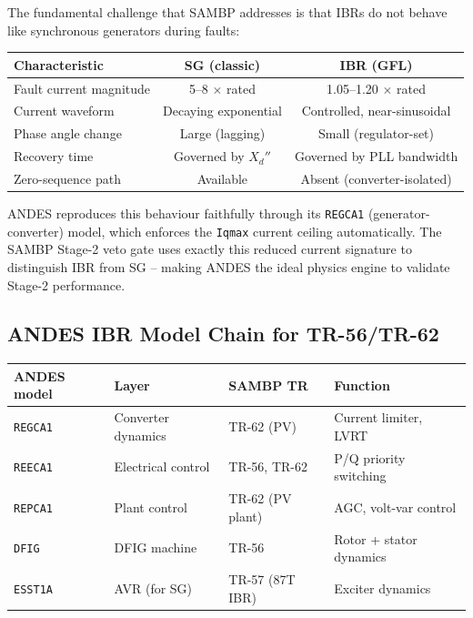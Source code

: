 \documentclass[11pt,a4paper]{article}
\begin{document}
The fundamental challenge that SAMBP addresses is that IBRs do not
behave like synchronous generators during faults:

\begin{center}
\begin{tabular}{lcc}
\toprule
\textbf{Characteristic} & \textbf{SG (classic)} & \textbf{IBR (GFL)} \\
\midrule
Fault current magnitude & 5--8 $\times$ rated & 1.05--1.20 $\times$ rated \\
Current waveform        & Decaying exponential  & Controlled, near-sinusoidal \\
Phase angle change      & Large (lagging)       & Small (regulator-set) \\
Recovery time           & Governed by $X_d''$   & Governed by PLL bandwidth \\
Zero-sequence path      & Available             & Absent (converter-isolated) \\
\bottomrule
\end{tabular}
\end{center}

ANDES reproduces this behaviour faithfully through its \texttt{REGCA1}
(generator-converter) model, which enforces the \texttt{Iqmax} current
ceiling automatically. The SAMBP Stage-2 veto gate uses exactly this
reduced current signature to distinguish IBR from SG -- making ANDES
the ideal physics engine to validate Stage-2 performance.

\subsection{ANDES IBR Model Chain for TR-56/TR-62}

\begin{center}
\begin{tabular}{llll}
\toprule
\textbf{ANDES model} & \textbf{Layer} & \textbf{SAMBP TR} & \textbf{Function} \\
\midrule
\texttt{REGCA1} & Converter dynamics & TR-62 (PV) & Current limiter, LVRT \\
\texttt{REECA1} & Electrical control & TR-56, TR-62 & P/Q priority switching \\
\texttt{REPCA1} & Plant control      & TR-62 (PV plant) & AGC, volt-var control \\
\texttt{DFIG}   & DFIG machine       & TR-56            & Rotor + stator dynamics \\
\texttt{ESST1A} & AVR (for SG)       & TR-57 (87T IBR)  & Exciter dynamics \\
\bottomrule
\end{tabular}
\end{center}
\end{document}
